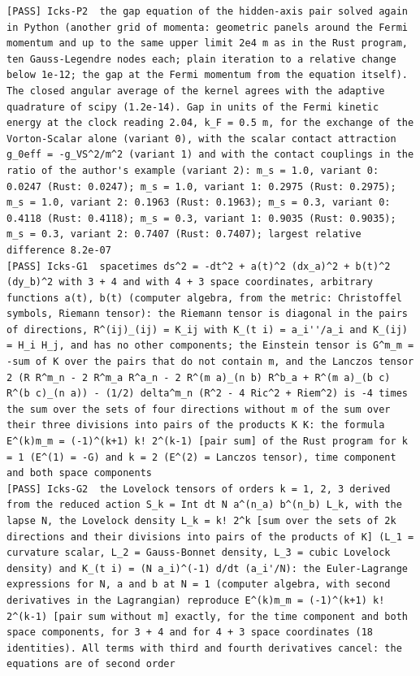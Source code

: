 \documentclass[
  10pt,
]{article}
\begin{document}
\begin{verbatim}
[PASS] Icks-P2  the gap equation of the hidden-axis pair solved again in Python (another grid of momenta: geometric panels around the Fermi momentum and up to the same upper limit 2e4 m as in the Rust program, ten Gauss-Legendre nodes each; plain iteration to a relative change below 1e-12; the gap at the Fermi momentum from the equation itself). The closed angular average of the kernel agrees with the adaptive quadrature of scipy (1.2e-14). Gap in units of the Fermi kinetic energy at the clock reading 2.04, k_F = 0.5 m, for the exchange of the Vorton-Scalar alone (variant 0), with the scalar contact attraction g_0eff = -g_VS^2/m^2 (variant 1) and with the contact couplings in the ratio of the author's example (variant 2): m_s = 1.0, variant 0: 0.0247 (Rust: 0.0247); m_s = 1.0, variant 1: 0.2975 (Rust: 0.2975); m_s = 1.0, variant 2: 0.1963 (Rust: 0.1963); m_s = 0.3, variant 0: 0.4118 (Rust: 0.4118); m_s = 0.3, variant 1: 0.9035 (Rust: 0.9035); m_s = 0.3, variant 2: 0.7407 (Rust: 0.7407); largest relative difference 8.2e-07
[PASS] Icks-G1  spacetimes ds^2 = -dt^2 + a(t)^2 (dx_a)^2 + b(t)^2 (dy_b)^2 with 3 + 4 and with 4 + 3 space coordinates, arbitrary functions a(t), b(t) (computer algebra, from the metric: Christoffel symbols, Riemann tensor): the Riemann tensor is diagonal in the pairs of directions, R^(ij)_(ij) = K_ij with K_(t i) = a_i''/a_i and K_(ij) = H_i H_j, and has no other components; the Einstein tensor is G^m_m = -sum of K over the pairs that do not contain m, and the Lanczos tensor 2 (R R^m_n - 2 R^m_a R^a_n - 2 R^(m a)_(n b) R^b_a + R^(m a)_(b c) R^(b c)_(n a)) - (1/2) delta^m_n (R^2 - 4 Ric^2 + Riem^2) is -4 times the sum over the sets of four directions without m of the sum over their three divisions into pairs of the products K K: the formula E^(k)m_m = (-1)^(k+1) k! 2^(k-1) [pair sum] of the Rust program for k = 1 (E^(1) = -G) and k = 2 (E^(2) = Lanczos tensor), time component and both space components
[PASS] Icks-G2  the Lovelock tensors of orders k = 1, 2, 3 derived from the reduced action S_k = Int dt N a^(n_a) b^(n_b) L_k, with the lapse N, the Lovelock density L_k = k! 2^k [sum over the sets of 2k directions and their divisions into pairs of the products of K] (L_1 = curvature scalar, L_2 = Gauss-Bonnet density, L_3 = cubic Lovelock density) and K_(t i) = (N a_i)^(-1) d/dt (a_i'/N): the Euler-Lagrange expressions for N, a and b at N = 1 (computer algebra, with second derivatives in the Lagrangian) reproduce E^(k)m_m = (-1)^(k+1) k! 2^(k-1) [pair sum without m] exactly, for the time component and both space components, for 3 + 4 and for 4 + 3 space coordinates (18 identities). All terms with third and fourth derivatives cancel: the equations are of second order

\end{verbatim}
\end{document}
